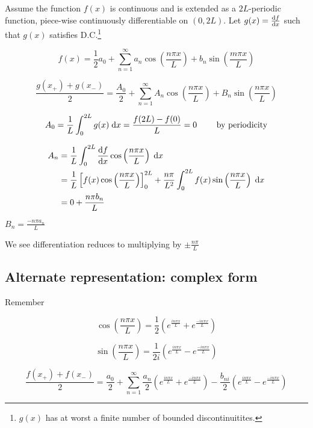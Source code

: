 \documentclass[a4paper]{article}
\begin{document}
\begin{eg}
	Assume the function $ f(x) $ is continuous and is extended as a $ 2L $-periodic function, piece-wise continuously differentiable on $ (0,2L) $. Let $ g(x) = \frac{\mathrm{d} f}{\mathrm{d} x} $ such that $ g(x) $ satisfies D.C.\footnote{$ g(x) $ has at worst a finite number of bounded discontinuitites.} 
	
	\[ f(x) =  \frac{1}{2} a_{0} + \sum_{n=1}^{\infty} a_{n} \cos \left( \frac{n \pi x}{L} \right) + b_{n} \sin \left( \frac{m \pi x}{L} \right) \]
	
	\[ \frac{g(x_{+}) + g(x_{-})}{2} = \frac{A_{0}}{2} + \sum_{n=1}^{\infty} A_{n} \cos \left( \frac{n \pi x}{L} \right) + B_{n} \sin \left( \frac{n \pi x}{L} \right)   \]
	
	\[ A_{0} = \frac{1}{L} \int_{0}^{2L} g(x) \; \mathrm{d} x = \frac{f(2L)  - f(0)}{L} = 0 \qquad \text{ by periodicity} \]
	
	\begin{align*}
		A_{n} & = \frac{1}{L} \int_{0}^{2L} \frac{\mathrm{d} f}{\mathrm{d} x} \cos \left( \frac{n \pi x}{L} \right) \; \mathrm{d} x\\
		& = \frac{1}{L} \left[ f(x) \cos \left(\frac{n \pi x}{L} \right)  \right]_{0}^{2L} + \frac{n \pi}{L^{2}} \int_{0}^{2L} f(x) \sin \left( \frac{n \pi x}{L} \right) \; \mathrm{d} x \\
		&= 0 + \frac{n \pi b_{n}}{L}
	\end{align*}

	\begin{ex}
		$ B_{n} = \frac{- n \pi a_{n}}{L} $
	\end{ex}
\end{eg}

We see differentiation reduces to multiplying by $ \pm \frac{n \pi}{L} $


\subsection{Alternate representation: complex form}

Remember 

\[ \cos \left( \frac{n \pi x}{L} \right) = \frac{1}{2} \left(  e^{\frac{ i n \pi x}{L}} + e^{\frac{- i n \pi x}{L}}  \right)  \]

\[ \sin \left( \frac{n \pi x}{L} \right) = \frac{1}{2i} \left(  e^{\frac{ i n \pi x}{L}} - e^{\frac{- i n \pi x}{L}}  \right)  \]

\[ \frac{f(x_{+}) + f(x_{-})}{2} = \frac{a_{0}}{2} + \sum_{n=1}^{\infty} \frac{a_{n}}{2} \left(  e^{\frac{ i n \pi x}{L}} + e^{\frac{- i n \pi x}{L}}  \right) - \frac{b_{n i}}{2} \left(  e^{\frac{ i n \pi x}{L}} - e^{\frac{- i n \pi x}{L}}  \right)\]
\end{document}
